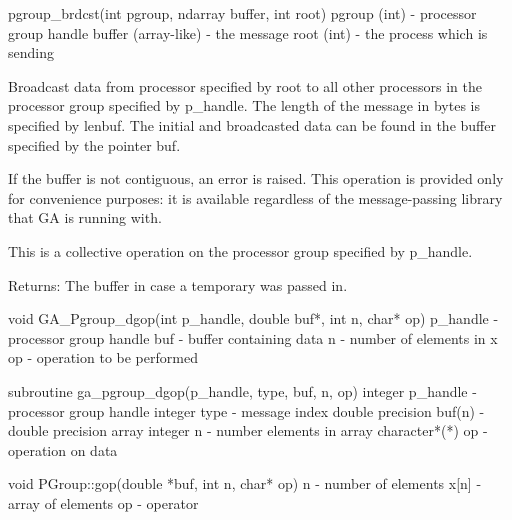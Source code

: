 \documentclass[12pt]{article}
\begin{document}
\begin{pyapi}
pgroup_brdcst(int pgroup, ndarray buffer, int root) 
   pgroup (int)        - processor group handle 
   buffer (array-like) - the message 
   root (int)          - the process which is sending 
\end{pyapi}

\begin{desc}

Broadcast data from processor specified by root to all other processors in the processor group specified by p_handle. The length of the message in bytes is specified by lenbuf. The initial and broadcasted data can be found in the buffer specified by the pointer buf.

If the buffer is not contiguous, an error is raised. This operation is provided only for convenience purposes: it is available regardless of the message-passing library that GA is running with.


This is a collective operation on the processor group specified by p_handle. 

Returns: 
The buffer in case a temporary was passed in. 
\end{desc}


\begin{capi}
void GA_Pgroup_dgop(int p_handle, double buf*, int n, char* op)
   p_handle                      - processor group handle                  \access{[input]} 
   buf                           - buffer containing data            
   n                             - number of elements in x                 \access{[input]} 
   op                            - operation to be performed               \access{[input]} 
\end{capi}

\begin{fapi}
subroutine ga_pgroup_dgop(p_handle, type, buf, n, op)
   integer p_handle              - processor group handle                  \access{[input]} 
   integer type                  - message index                           \access{[input]} 
   double precision buf(n)       - double precision array            
   integer n                     - number elements in array                \access{[input]} 
   character*(*) op              - operation on data                       \access{[input]} 
\end{fapi}

\begin{cxxapi}
void PGroup::gop(double *buf, int n, char* op)
   n              - number of elements                                     \access{[input]}
   x[n]           - array of elements                               
   op             - operator                                               \access{[input]}
\end{cxxapi}
\end{document}

